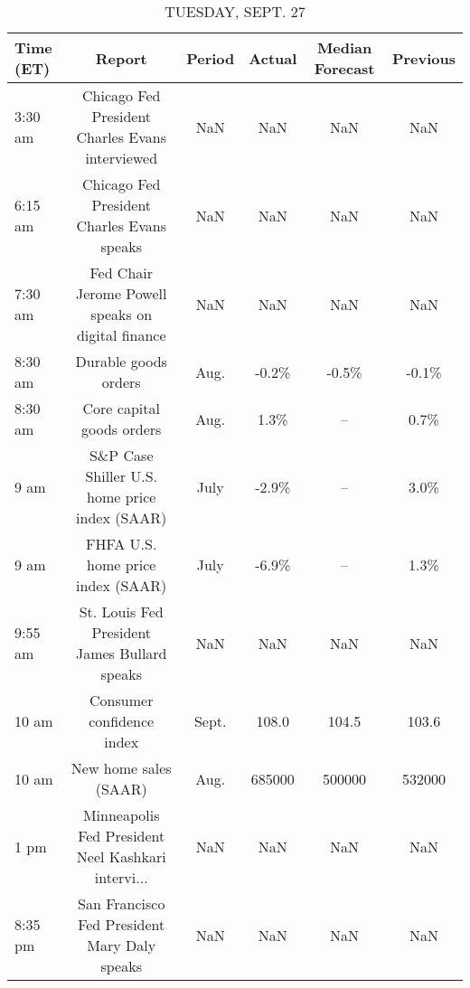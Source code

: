 \documentclass{article}%
\begin{document}
\begin{table}[htbp]%
\caption{TUESDAY, SEPT. 27}%
\centering%
\begin{adjustbox}{width=1\textwidth}%
\begin{tabular}{lccccc}
\toprule
Time (ET) &                                             Report & Period & Actual & Median Forecast & Previous \\
\midrule
  3:30 am &    Chicago Fed President Charles Evans interviewed &    NaN &    NaN &             NaN &      NaN \\
  6:15 am &         Chicago Fed President Charles Evans speaks &    NaN &    NaN &             NaN &      NaN \\
  7:30 am &  Fed Chair Jerome Powell speaks on digital finance &    NaN &    NaN &             NaN &      NaN \\
  8:30 am &                               Durable goods orders &   Aug. &  -0.2\% &           -0.5\% &    -0.1\% \\
  8:30 am &                          Core capital goods orders &   Aug. &   1.3\% &              -- &     0.7\% \\
     9 am &      S\&P Case Shiller U.S. home price index (SAAR) &   July &  -2.9\% &              -- &     3.0\% \\
     9 am &                  FHFA U.S. home price index (SAAR) &   July &  -6.9\% &              -- &     1.3\% \\
  9:55 am &       St. Louis Fed President James Bullard speaks &    NaN &    NaN &             NaN &      NaN \\
    10 am &                          Consumer confidence index &  Sept. &  108.0 &           104.5 &    103.6 \\
    10 am &                              New home sales (SAAR) &   Aug. & 685000 &          500000 &   532000 \\
     1 pm & Minneapolis Fed President Neel Kashkari intervi... &    NaN &    NaN &             NaN &      NaN \\
  8:35 pm &       San Francisco Fed President Mary Daly speaks &    NaN &    NaN &             NaN &      NaN \\
\bottomrule
\end{tabular}
%
\end{adjustbox}%
\end{table}

%
\end{document}
